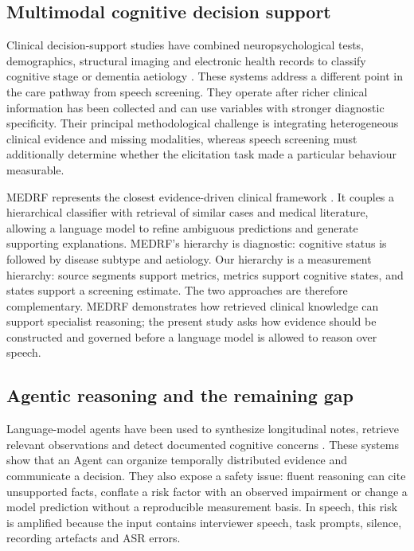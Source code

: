 \documentclass[pdflatex,sn-nature]{sn-jnl}
\begin{document}
\subsection{Multimodal cognitive decision support}

Clinical decision-support studies have combined neuropsychological tests, demographics, structural imaging and electronic health records to classify cognitive stage or dementia aetiology \cite{Qiu2022,Xue2024}. These systems address a different point in the care pathway from speech screening. They operate after richer clinical information has been collected and can use variables with stronger diagnostic specificity. Their principal methodological challenge is integrating heterogeneous clinical evidence and missing modalities, whereas speech screening must additionally determine whether the elicitation task made a particular behaviour measurable.

MEDRF represents the closest evidence-driven clinical framework \cite{Hu2026}. It couples a hierarchical classifier with retrieval of similar cases and medical literature, allowing a language model to refine ambiguous predictions and generate supporting explanations. MEDRF's hierarchy is diagnostic: cognitive status is followed by disease subtype and aetiology. Our hierarchy is a measurement hierarchy: source segments support metrics, metrics support cognitive states, and states support a screening estimate. The two approaches are therefore complementary. MEDRF demonstrates how retrieved clinical knowledge can support specialist reasoning; the present study asks how evidence should be constructed and governed before a language model is allowed to reason over speech.

\subsection{Agentic reasoning and the remaining gap}

Language-model agents have been used to synthesize longitudinal notes, retrieve relevant observations and detect documented cognitive concerns \cite{Li2025,Tian2026}. These systems show that an Agent can organize temporally distributed evidence and communicate a decision. They also expose a safety issue: fluent reasoning can cite unsupported facts, conflate a risk factor with an observed impairment or change a model prediction without a reproducible measurement basis. In speech, this risk is amplified because the input contains interviewer speech, task prompts, silence, recording artefacts and ASR errors.
\end{document}
